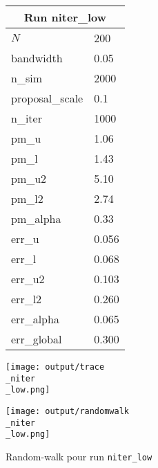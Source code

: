 
\begin{figure}[H]
  \centering
  \begin{minipage}[t]{0.45\textwidth}
    \vspace{0pt}
    \footnotesize
    \begin{tabular}{|l|l|}\hline
    \multicolumn{2}{|c|}{\textbf{Run niter\_low}} \\ \hline
    $N$ & 200 \\ \hline
    bandwidth & 0.05 \\ \hline
    n\_sim & 2000 \\ \hline
    proposal\_scale & 0.1 \\ \hline
    n\_iter & 1000 \\ \hline
    pm\_u & 1.06 \\ \hline
    pm\_l & 1.43 \\ \hline
    pm\_u2 & 5.10 \\ \hline
    pm\_l2 & 2.74 \\ \hline
    pm\_alpha & 0.33 \\ \hline
    err\_u & 0.056 \\ \hline
    err\_l & 0.068 \\ \hline
    err\_u2 & 0.103 \\ \hline
    err\_l2 & 0.260 \\ \hline
    err\_alpha & 0.065 \\ \hline
    err\_global & 0.300 \\ \hline
    \end{tabular}
  \end{minipage}
  \hfill
  \begin{minipage}[t]{0.45\textwidth}
    \vspace{0pt}
    \texttt{[image: output/trace\\\_niter\\\_low.png]}
  \end{minipage}
\end{figure}

\begin{figure}[H]
  \centering
  \texttt{[image: output/randomwalk\\\_niter\\\_low.png]}
  \caption{Random-walk pour run \texttt{niter\_low}}
\end{figure}

